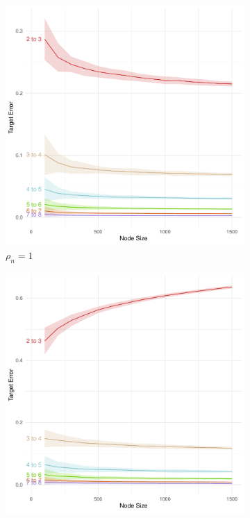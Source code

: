 \documentclass[10pt,journal,compsoc]{IEEEtran}
\numberwithin{equation}{section}
\begin{document}
\begin{figure}[htbp]
\begin{subfigure}{.49\columnwidth}
\includegraphics[width=\columnwidth]{MR_d_1.pdf}%
\caption{$\rho_n = 1$}
\end{subfigure}
\begin{subfigure}{.49\columnwidth}
\includegraphics[width=\columnwidth]{MR_13_1.pdf}%

\end{subfigure}
\end{figure}
\end{document}
